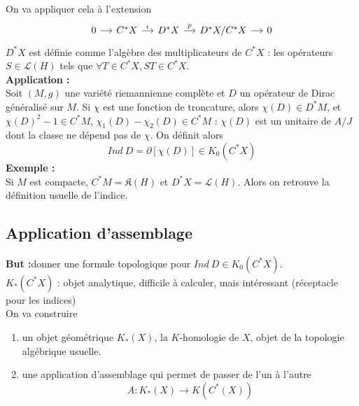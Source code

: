 \documentclass{beamer}
\begin{document}
\begin{frame}
On va appliquer cela à l'extension \[\begin{tikzcd}[ampersand replacement=\&,column sep = small]
0 \arrow{r} \& C^*X \arrow{r}{\iota} \& D^*X\arrow{r}{p} \& D^*X/C^*X\arrow{r} \& 0  
\end{tikzcd}\]
$D^* X$ est définie comme l'algèbre des multiplicateurs de $C^*X$ : les opérateurs $S\in \mathcal L(H)$ tels que $\forall T\in C^*X, ST\in C^* X$.\\
\textbf{Application :}\\
Soit $(M,g)$ une variété riemannienne complète et $D$ un opérateur de Dirac généralisé sur $M$. Si $\chi$ est une fonction de troncature, alors $\chi(D)\in D^*M$, et $\chi(D)^2-1\in C^*M$, $\chi_1(D)-\chi_2(D)\in C^*M$ : $\chi(D)$ est un unitaire de $A/J$ dont la classe ne dépend pas de $\chi$. On définit alors 
\[Ind \ D = \partial [\chi(D)] \in K_0(C^*X)\]
\textbf{Exemple :}\\
Si $M$ est compacte, $C^*M = \mathfrak K(H)$ et $D^*X = \mathcal L(H)$. Alors on retrouve la définition usuelle de l'indice.
\end{frame}

\subsection{Application d'assemblage}
\begin{frame}
\textbf{But :}donner une formule topologique pour $Ind\ D\in K_0(C^*X)$.\\

$K_*(C^*X)$ : objet analytique, difficile à calculer, mais intéressant (réceptacle pour les indices)\\

On va construire 
\begin{enumerate}
\item un objet géométrique $K_*(X)$, la $K$-homologie de $X$, objet de la topologie algébrique usuelle. 
\item une application d'assemblage qui permet de passer de l'un à l'autre
\[A : K_*(X)\rightarrow K(C^*(X))\]
\end{enumerate} 
 
\end{frame}
\end{document}
